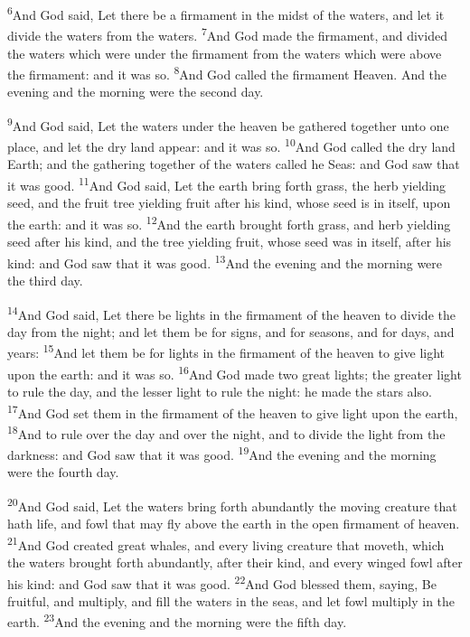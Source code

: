 \documentclass[10pt,oneside,a4paper]{memoir}
\renewcommand{\verse}[1]{\textsuperscript{#1}}
\begin{document}
\begin{paracol}{2}
\verse{6}And God said, Let there be a firmament in the midst of the waters, and let it divide the waters from the waters.  
\verse{7}And God made the firmament, and divided the waters which were under the firmament from the waters which were above the firmament: and it was so.  
\verse{8}And God called the firmament Heaven. And the evening and the morning were the second day.  

\verse{9}And God said, Let the waters under the heaven be gathered together unto one place, and let the dry land appear: and it was so.  
\verse{10}And God called the dry land Earth; and the gathering together of the waters called he Seas: and God saw that it was good.  
\verse{11}And God said, Let the earth bring forth grass, the herb yielding seed, and the fruit tree yielding fruit after his kind, whose seed is in itself, upon the earth: and it was so.  
\verse{12}And the earth brought forth grass, and herb yielding seed after his kind, and the tree yielding fruit, whose seed was in itself, after his kind: and God saw that it was good.  
\verse{13}And the evening and the morning were the third day.  

\verse{14}And God said, Let there be lights in the firmament of the heaven to divide the day from the night; and let them be for signs, and for seasons, and for days, and years: 
\verse{15}And let them be for lights in the firmament of the heaven to give light upon the earth: and it was so.  
\verse{16}And God made two great lights; the greater light to rule the day, and the lesser light to rule the night: he made the stars also.  
\verse{17}And God set them in the firmament of the heaven to give light upon the earth, 
\verse{18}And to rule over the day and over the night, and to divide the light from the darkness: and God saw that it was good.  
\verse{19}And the evening and the morning were the fourth day.  

\verse{20}And God said, Let the waters bring forth abundantly the moving creature that hath life, and fowl that may fly above the earth in the open firmament of heaven.  
\verse{21}And God created great whales, and every living creature that moveth, which the waters brought forth abundantly, after their kind, and every winged fowl after his kind: and God saw that it was good.  
\verse{22}And God blessed them, saying, Be fruitful, and multiply, and fill the waters in the seas, and let fowl multiply in the earth.  
\verse{23}And the evening and the morning were the fifth day.  


\end{paracol}
\end{document}
